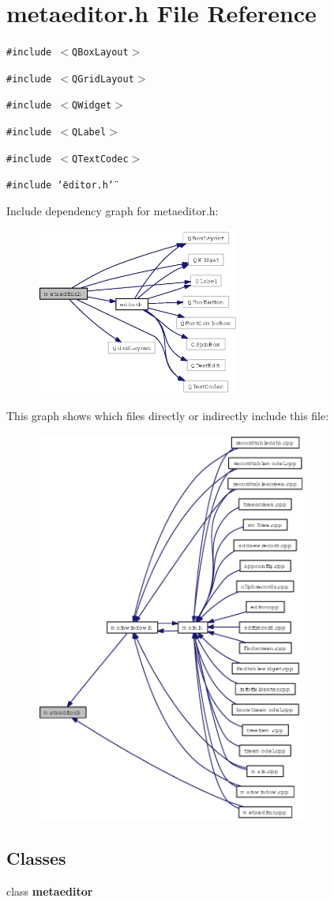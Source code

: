 \section{metaeditor.h File Reference}
\label{metaeditor_8h}
{\tt \#include $<$QBox\-Layout$>$}\par
{\tt \#include $<$QGrid\-Layout$>$}\par
{\tt \#include $<$QWidget$>$}\par
{\tt \#include $<$QLabel$>$}\par
{\tt \#include $<$QText\-Codec$>$}\par
{\tt \#include \char`\"{}editor.h\char`\"{}}\par


Include dependency graph for metaeditor.h:\begin{figure}[H]
\begin{center}
\leavevmode
\includegraphics[width=190pt]{metaeditor_8h__incl}
\end{center}
\end{figure}


This graph shows which files directly or indirectly include this file:\begin{figure}[H]
\begin{center}
\leavevmode
\includegraphics[width=253pt]{metaeditor_8h__dep__incl}
\end{center}
\end{figure}
\subsection*{Classes}
\begin{CompactItemize}
\item 
class {\bf metaeditor}
\end{CompactItemize}
